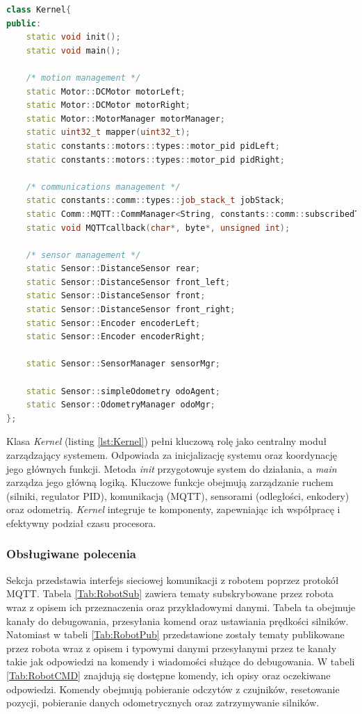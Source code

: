 \documentclass[12pt,twoside]{article}
\begin{document}
\begin{lstlisting}[language=C++, caption={Klasa Kernel}, label={lst:Kernel}]
class Kernel{
public:
    static void init();
    static void main();
    
    /* motion management */
    static Motor::DCMotor motorLeft;
    static Motor::DCMotor motorRight;
    static Motor::MotorManager motorManager;
    static uint32_t mapper(uint32_t);
    static constants::motors::types::motor_pid pidLeft;
    static constants::motors::types::motor_pid pidRight;

    /* communications management */
    static constants::comm::types::job_stack_t jobStack;
    static Comm::MQTT::CommManager<String, constants::comm::subscribedTopics> commMgr;
    static void MQTTcallback(char*, byte*, unsigned int);

    /* sensor management */
    static Sensor::DistanceSensor rear;
    static Sensor::DistanceSensor front_left;
    static Sensor::DistanceSensor front;
    static Sensor::DistanceSensor front_right;
    static Sensor::Encoder encoderLeft;
    static Sensor::Encoder encoderRight;

    static Sensor::SensorManager sensorMgr;

    static Sensor::simpleOdometry odoAgent;
    static Sensor::OdometryManager odoMgr;
};    
\end{lstlisting}

Klasa \textit{Kernel} (listing \ref{lst:Kernel}) pełni kluczową rolę jako centralny moduł zarządzający systemem. Odpowiada za inicjalizację systemu oraz koordynację jego głównych funkcji. Metoda \textit{init} przygotowuje system do działania, a \textit{main} zarządza jego główną logiką. Kluczowe funkcje obejmują zarządzanie ruchem (silniki, regulator PID), komunikacją (MQTT), sensorami (odległości, enkodery) oraz odometrią. \textit{Kernel} integruje te komponenty, zapewniając ich współpracę i efektywny podział czasu procesora.

\subsubsection{Obsługiwane polecenia}

Sekcja przedstawia interfejs sieciowej komunikacji z robotem poprzez protokół MQTT. Tabela \ref{Tab:RobotSub} zawiera tematy subskrybowane przez robota wraz z opisem ich przeznaczenia oraz przykładowymi danymi. Tabela ta obejmuje kanały do debugowania, przesyłania komend oraz ustawiania prędkości silników. Natomiast w tabeli \ref{Tab:RobotPub} przedstawione zostały tematy publikowane przez robota wraz z opisem i typowymi danymi przesyłanymi przez te kanały takie jak odpowiedzi na komendy i wiadomości służące do debugowania. W tabeli \ref{Tab:RobotCMD} znajdują się dostępne komendy, ich opisy oraz oczekiwane odpowiedzi. Komendy obejmują pobieranie odczytów z czujników, resetowanie pozycji, pobieranie danych odometrycznych oraz zatrzymywanie silników.
\end{document}
